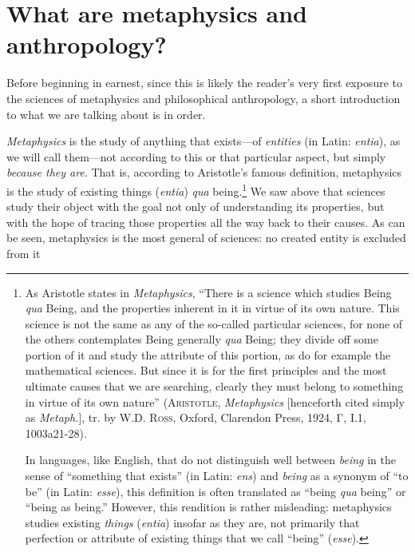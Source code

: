 \documentclass[
  12pt,
]{memoir}
\begin{document}
\section{What are metaphysics and
anthropology?}\label{what-are-metaphysics-and-anthropology}

Before beginning in earnest, since this is likely the reader's very
first exposure to the sciences of metaphysics and philosophical
anthropology, a short introduction to what we are talking about is in
order.

\emph{Metaphysics} is the study of anything that exists---of
\emph{entities} (in Latin: \emph{entia}), as we will call them---not
according to this or that particular aspect, but simply \emph{because
they are}. That is, according to Aristotle's famous definition,
metaphysics is the study of existing things (\emph{entia}) \emph{qua}
being.\footnote{As Aristotle states in \emph{Metaphysics}, ``There is a
  science which studies Being \emph{qua} Being, and the properties
  inherent in it in virtue of its own nature. This science is not the
  same as any of the so-called particular sciences, for none of the
  others contemplates Being generally \emph{qua} Being; they divide off
  some portion of it and study the attribute of this portion, as do for
  example the mathematical sciences. But since it is for the first
  principles and the most ultimate causes that we are searching, clearly
  they must belong to something in virtue of its own nature''
  (\textsc{Aristotle}, \emph{Metaphysics} {[}henceforth cited simply as
  \emph{Metaph.}{]}, tr. by \textsc{W.D. Ross}, Oxford, Clarendon Press,
  1924, Γ, I.1, 1003a21-28).

  \par

  In languages, like English, that do not distinguish well between
  \emph{being} in the sense of ``something that exists'' (in Latin:
  \emph{ens}) and \emph{being} as a synonym of ``to be'' (in Latin:
  \emph{esse}), this definition is often translated as ``being
  \emph{qua} being'' or ``being as being.'' However, this rendition is
  rather misleading: metaphysics studies existing \emph{things}
  (\emph{entia}) insofar as they are, not primarily that perfection or
  attribute of existing things that we call ``being'' (\emph{esse}).} We
saw above that sciences study their object with the goal not only of
understanding its properties, but with the hope of tracing those
properties all the way back to their causes. As can be seen, metaphysics
is the most general of sciences: no created entity is excluded from it
\end{document}
